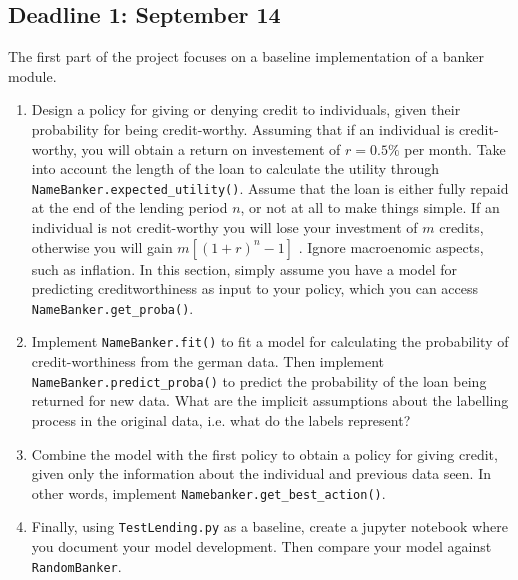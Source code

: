 \subsection{Deadline 1: September 14}
The first part of the project focuses on a baseline implementation of a banker module.
\begin{enumerate}
\item Design a policy for giving or denying credit to individuals, given their probability for being credit-worthy. Assuming that if an individual is credit-worthy, you will obtain a return on investement of $r = 0.5\%$ per month. Take into account the length of the loan to calculate the utility through \verb|NameBanker.expected_utility()|. Assume that the loan is either fully repaid at the end of the lending period $n$, or not at all to make things simple. If an individual is not credit-worthy you will lose your investment of $m$ credits, otherwise you will gain $m [(1 + r)^{n} - 1]$ . Ignore macroenomic aspects, such as inflation. In this section, simply assume you have a model for predicting creditworthiness as input to your policy, which you can access \verb|NameBanker.get_proba()|. 
\item Implement \verb|NameBanker.fit()| to fit a model for calculating the probability of credit-worthiness from the german data. Then implement \verb|NameBanker.predict_proba()| to predict the probability of the loan being returned for new data. What are the implicit assumptions about the labelling process in the original data, i.e. what do the labels represent?
\item Combine the model with the first policy to obtain a policy for giving credit, given only the information about the individual and previous data seen. In other words, implement \verb|Namebanker.get_best_action()|.
\item Finally, using \verb|TestLending.py| as a baseline, create a jupyter notebook where you document your model development. Then compare your model against \verb|RandomBanker|.
\end{enumerate}

